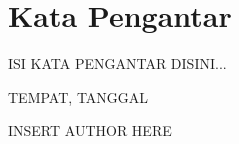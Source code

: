 \chapter*{Kata Pengantar}

{{ISI KATA PENGANTAR DISINI...}}

\begin{flushright}
  {{TEMPAT}}, {{TANGGAL}}


  {{INSERT AUTHOR HERE}}
\end{flushright}